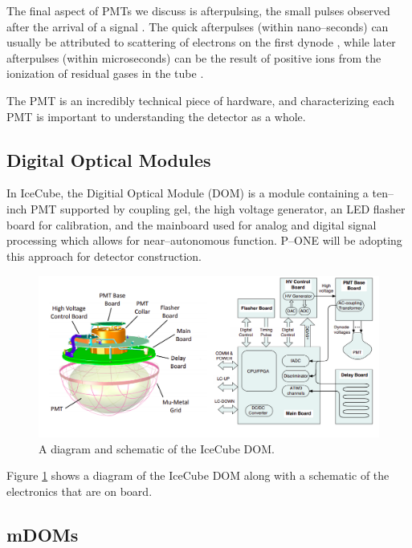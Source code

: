 The final aspect of PMTs we discuss is afterpulsing, the small pulses observed after the arrival of a signal \cite{ham}. The quick afterpulses (within nano--seconds) can usually be attributed to scattering of electrons on the first dynode \cite{ham}, while later afterpulses (within microseconds) can be the result of positive ions from the ionization of residual gases in the tube \cite{ham}.

The PMT is an incredibly technical piece of hardware, and characterizing each PMT is important to understanding the detector as a whole. 

\subsection{Digital Optical Modules}

In IceCube, the Digitial Optical Module (DOM) is a module containing a ten--inch PMT supported by coupling gel, the high voltage generator, an LED flasher board for calibration, and the mainboard used for analog and digital signal processing \cite{icecube_pmt,icecube} which allows for near--autonomous function. P--ONE will be adopting this approach for detector construction.

\begin{figure}[H]
  \centering
  \includegraphics[width=.9\textwidth]{./Figures/icecube_dom.png}
  \caption{A diagram and schematic of the IceCube DOM.}
  \label{fig:ice_dom}
\end{figure}

Figure \ref{fig:ice_dom} shows a diagram of the IceCube DOM along with a schematic of the electronics that are on board. 


\subsection{mDOMs}

